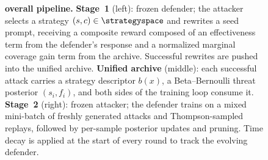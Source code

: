 \begin{figure}[t]
  \centering
  \fbox{\rule[-2.8cm]{0pt}{5.6cm}\rule[-2.8cm]{0.95\linewidth}{0pt}}
  \caption{\textbf{\method overall pipeline.} \textbf{Stage~1} (left): frozen defender; the attacker selects a strategy $(s,c)\in\strategyspace$ and rewrites a seed prompt, receiving a composite reward composed of an effectiveness term from the defender's response and a normalized marginal coverage gain term from the archive. Successful rewrites are pushed into the unified archive. \textbf{Unified archive} (middle): each successful attack carries a strategy descriptor $b(x)$, a Beta--Bernoulli threat posterior $(s_i,f_i)$, and both sides of the training loop consume it. \textbf{Stage~2} (right): frozen attacker; the defender trains on a mixed mini-batch of freshly generated attacks and Thompson-sampled replays, followed by per-sample posterior updates and pruning. Time decay is applied at the start of every round to track the evolving defender.}
  \label{fig:pipeline}
\end{figure}

